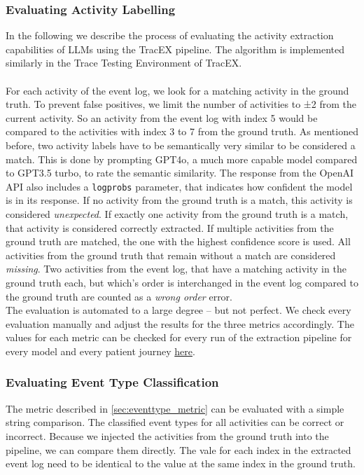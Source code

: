 \subsubsection{Evaluating Activity Labelling}\label{sec:eval_activity}
In the following we describe the process of evaluating the activity extraction capabilities of LLMs using the TracEX pipeline. The algorithm is implemented similarly in the Trace Testing Environment of TracEX.\\\\
For each activity of the event log, we look for a matching activity in the ground truth. To prevent false positives, we limit the number of activities to ±2 from the current activity. So an activity from the event log with index 5 would be compared to the activities with index 3 to 7 from the ground truth. As mentioned before, two activity labels have to be semantically very similar to be considered a match. This is done by prompting GPT4o, a much more capable model compared to GPT3.5 turbo, to rate the semantic similarity. The response from the OpenAI API also includes a \verb|logprobs| parameter, that indicates how confident the model is in its response. If no activity from the ground truth is a match, this activity is considered \emph{unexpected}. If exactly one activity from the ground truth is a match, that activity is considered correctly extracted. If multiple activities from the ground truth are matched, the one with the highest confidence score is used. All activities from the ground truth that remain without a match are considered \emph{missing}. Two activities from the event log, that have a matching activity in the ground truth each, but which's order is interchanged in the event log compared to the ground truth are counted as a \emph{wrong order} error.\\
The evaluation is automated to a large degree – but not perfect. We check every evaluation manually and adjust the results for the three metrics accordingly. The values for each metric can be checked for every run of the extraction pipeline for every model and every patient journey \href{https://github.com/FR-SON/Bachelor-Thesis/tree/main/bachelor_thesis/data/evaluation_data}{here}.

\subsubsection{Evaluating Event Type Classification}\label{sec:eval_event_type}
The metric described in \ref{sec:eventtype_metric} can be evaluated with a simple string comparison. The classified event types for all activities can be correct or incorrect. Because we injected the activities from the ground truth into the pipeline, we can compare them directly. The vale for each index in the extracted event log need to be identical to the value at the same index in the ground truth.

